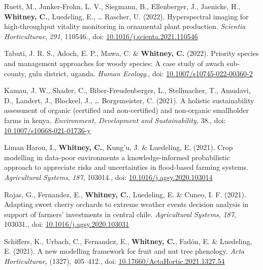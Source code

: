 \documentclass[11pt,a4paper,]{awesome-cv}
\newlength{\cslhangindent}
\newenvironment{CSLReferences}[2] %
 {\begin{list}{}{%
  \setlength{\itemindent}{0pt}
  \setlength{\leftmargin}{0pt}
  \setlength{\parsep}{0pt}
  \ifodd #1
   \setlength{\leftmargin}{\cslhangindent}
   \setlength{\itemindent}{-1\cslhangindent}
  \fi
  \setlength{\itemsep}{#2\baselineskip}}}
 {\end{list}}
\begin{document}
\begin{CSLReferences}{1}{0}
Ruett, M., Junker-Frohn, L. V., Siegmann, B., Ellenberger, J., Jaenicke,
H., \textbf{Whitney, C.}, Luedeling, E., \ldots{} Rascher, U. (2022).
Hyperspectral imaging for high-throughput vitality monitoring in
ornamental plant production. \emph{Scientia Horticulturae}, \emph{291},
110546., doi:
\href{https://doi.org/10.1016/j.scienta.2021.110546}{10.1016/j.scienta.2021.110546}

Tabuti, J. R. S., Adoch, E. P., Mawa, C. \& \textbf{Whitney, C.} (2022).
Priority species and management approaches for woody species: A case
study of awach sub-county, gulu district, uganda. \emph{Human Ecology}.,
doi:
\href{https://doi.org/10.1007/s10745-022-00360-2}{10.1007/s10745-022-00360-2}

Kamau, J. W., Shader, C., Biber-Freudenberger, L., Stellmacher, T.,
Amudavi, D., Landert, J., Blockeel, J., \ldots{} Borgemeister, C.
(2021). A holistic sustainability assessment of organic (certified and
non-certified) and non-organic smallholder farms in kenya.
\emph{Environment, Development and Sustainability}, 38., doi:
\href{https://doi.org/10.1007/s10668-021-01736-y}{10.1007/s10668-021-01736-y}

Liman Harou, I., \textbf{Whitney, C.}, Kung'u, J. \& Luedeling, E.
(2021). Crop modelling in data-poor environments a knowledge-informed
probabilistic approach to appreciate risks and uncertainties in
flood-based farming systems. \emph{Agricultural Systems}, \emph{187},
103014., doi:
\href{https://doi.org/10.1016/j.agsy.2020.103014}{10.1016/j.agsy.2020.103014}

Rojas, G., Fernandez, E., \textbf{Whitney, C.}, Luedeling, E. \& Cuneo,
I. F. (2021). Adapting sweet cherry orchards to extreme weather events
decision analysis in support of farmers' investments in central chile.
\emph{Agricultural Systems}, \emph{187}, 103031., doi:
\href{https://doi.org/10.1016/j.agsy.2020.103031}{10.1016/j.agsy.2020.103031}

Schiffers, K., Urbach, C., Fernandez, E., \textbf{Whitney, C.}, Fadón,
E. \& Luedeling, E. (2021). A new modelling framework for fruit and nut
tree phenology. \emph{Acta Horticulturae}, (1327), 405--412., doi:
\href{https://doi.org/10.17660/ActaHortic.2021.1327.54}{10.17660/ActaHortic.2021.1327.54}


\end{CSLReferences}
\end{document}
